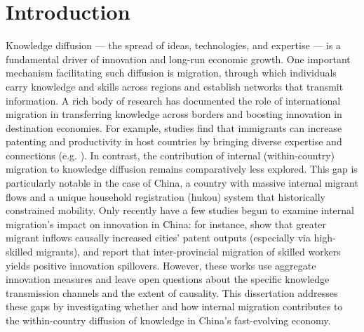 \documentclass[12pt]{article}
\begin{document}
\pagebreak \newpage
\doublespacing


\section{Introduction} \label{sec:introduction}

Knowledge diffusion --- the spread of ideas, technologies, and expertise --- is a fundamental driver of innovation and long-run economic growth. One important mechanism facilitating such diffusion is migration, through which individuals carry knowledge and skills across regions and establish networks that transmit information. A rich body of research has documented the role of international migration in transferring knowledge across borders and boosting innovation in destination economies. For example, studies find that immigrants can increase patenting and productivity in host countries by bringing diverse expertise and connections (e.g. \cite{kerrEthnicScientificCommunities2008, baharMigrationKnowledgeDiffusion2018, lissoniMigrationInnovationLearning2024}). In contrast, the contribution of internal (within-country) migration to knowledge diffusion remains comparatively less explored. This gap is particularly notable in the case of China, a country with massive internal migrant flows and a unique household registration (hukou) system that historically constrained mobility. Only recently have a few studies begun to examine internal migration's impact on innovation in China: for instance, \cite{guanHowDoesLargescale2025} show that greater migrant inflows causally increased cities' patent outputs (especially via high-skilled migrants), and \cite{gaoSpatialSpilloverEffects2024} report that inter-provincial migration of skilled workers yields positive innovation spillovers. However, these works use aggregate innovation measures and leave open questions about the specific knowledge transmission channels and the extent of causality. This dissertation addresses these gaps by investigating whether and how internal migration contributes to the within-country diffusion of knowledge in China's fast-evolving economy.
\end{document}

